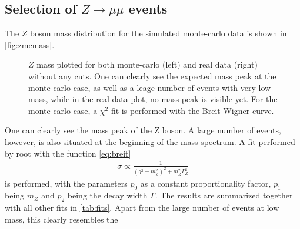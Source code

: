 \documentclass[twoside,        %
               BCOR12mm,       %
               ngerman,english, %
               fleqn,headsepline=false,footsepline=false
              ]{Vorlage/MFPREPORT}
\begin{document}
\subsection{Selection of $Z \rightarrow \mu\mu$ events}
The $Z$ boson mass distribution for the simulated monte-carlo data is shown in
\cref{fig:zmcmass}.
\begin{figure}
    \caption{$Z$ mass plotted for both monte-carlo (left) and real data (right)
    without any cuts. One can clearly see the expected mass peak at the monte
    carlo case, as well as a leage number of events with very low mass, while in
    the real data plot, no mass peak is visible yet. For the monte-carlo case,
    a $\chi^2$ fit is performed with the Breit-Wigner curve.}
\end{figure}
One can clearly see the mass peak of the Z boson. A large number of events,
however, is also situated at the beginning of the mass spectrum. A fit
performed by root with the function \ref{eq:breit}
\begin{align}
    \sigma\propto\frac{1}{(q^2-m_Z^2)^2+m_Z^2\Gamma_Z^2}
    \label{eq:breit}
\end{align}
is performed, with the parameters $p_0$ as a constant proportionality factor,
$p_1$ being $m_Z$ and $p_2$ being the decay width $\Gamma$. The results are
summarized together with all other fits in \cref{tab:fits}.
Apart from the large number of events at low mass, this clearly resembles the
\end{document}
